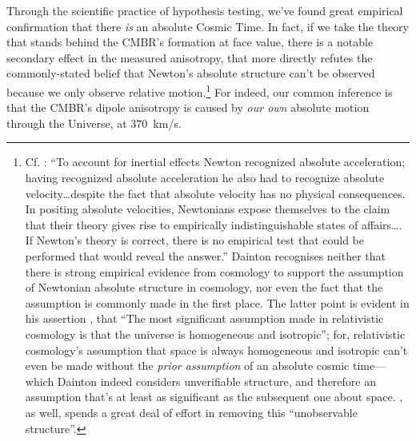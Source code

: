 \documentclass[12 pt]{article}
\begin{document}
Through the scientific practice of hypothesis testing, we've found great empirical confirmation that there \textit{is} an absolute Cosmic Time. In fact, if we take the theory that stands behind the CMBR's formation at face value, there is a notable secondary effect in the measured anisotropy, that more directly refutes the commonly-stated belief that Newton's absolute structure can't be observed because we only observe relative motion.\footnote{Cf. \citet[p.~181]{Dainton2001}: ``To account for inertial effects Newton recognized absolute acceleration; having recognized absolute acceleration he also had to recognize absolute velocity\ldots despite the fact that absolute velocity has no physical consequences. In positing absolute velocities, Newtonians expose themselves to the claim that their theory gives rise to empirically indistinguishable states of affairs\ldots. If Newton's theory is correct, there is no empirical test that could be performed that would reveal the answer.'' Dainton recognises neither that there is strong empirical evidence from cosmology to support the assumption of Newtonian absolute structure in cosmology, nor even the fact that the assumption is commonly made in the first place. The latter point is evident in his assertion \citep[p.~295]{Dainton2001}, that ``The most significant assumption made in relativistic cosmology is that the universe is homogeneous and isotropic''; for, relativistic cosmology's assumption that space is always homogeneous and isotropic can't even be made without the \textit{prior assumption} of an absolute cosmic time---which Dainton indeed considers unverifiable structure, and therefore an assumption that's at least as significant as the subsequent one about space. \citet{Maudlin2012}, as well, spends a great deal of effort in removing this ``unobservable structure''.} For indeed, our common inference is that the CMBR's dipole anisotropy is caused by \textit{our own} absolute motion through the Universe, at 370~km/s.
\end{document}
